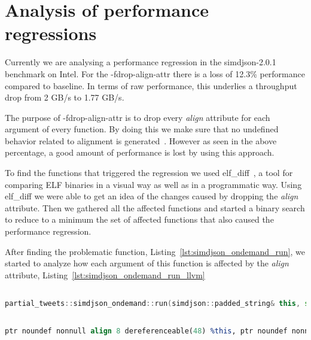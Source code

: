\section{Analysis of performance regressions}

Currently we are analysing a performance regression in the
simdjson-2.0.1~\cite{simdjsonbenchmark} benchmark on Intel. For the
-fdrop-align-attr there is a loss of 12.3\% performance compared to baseline. In
terms of raw performance, this underlies a throughput drop from 2 GB/s to 1.77
GB/s. 

The purpose of -fdrop-align-attr is to drop every \textit{align} attribute for
each argument of every function. By doing this we make sure that no undefined
behavior related to alignment is generated~\cite{align-semantics}. However as
seen in the above percentage, a good amount of performance is lost by using this
approach.

To find the functions that triggered the regression we used
elf_diff~\cite{elfdiff}, a tool for comparing ELF binaries in a visual way as
well as in a programmatic way. Using elf_diff we were able to get an idea of
the changes caused by dropping the \textit{align} attribute. Then we gathered
all the affected functions and started a binary search to reduce to a minimum
the set of affected functions that also caused the performance regression.

After finding the problematic function, Listing~\ref{lst:simdjson_ondemand_run},
we started to analyze how each argument of this function is affected by the
\textit{align} attribute, Listing~\ref{lst:simdjson_ondemand_run_llvm}

\begin{lstlisting}[language=C++, style=Cstyle, caption={Function that caused
performance regressions}, label={lst:simdjson_ondemand_run}]

partial_tweets::simdjson_ondemand::run(simdjson::padded_string& this, std::vector<partial_tweets::tweet<std::basic_string_view<char, std::char_traits<char> > > json, std::allocator<partial_tweets::tweet<std::basic_string_view<char, std::char_traits<char> > > > >& result)

\end{lstlisting}


\begin{lstlisting}[language=llvm, style=Cstyle, caption={LLVM representation of
arguments of partial_tweets::simdjson_ondemand::run}, label={lst:simdjson_ondemand_run_llvm}]

ptr noundef nonnull align 8 dereferenceable(48) %this, ptr noundef nonnull align 8 dereferenceable(16) %json, ptr noundef nonnull align 8 dereferenceable(24) %result

\end{lstlisting}

